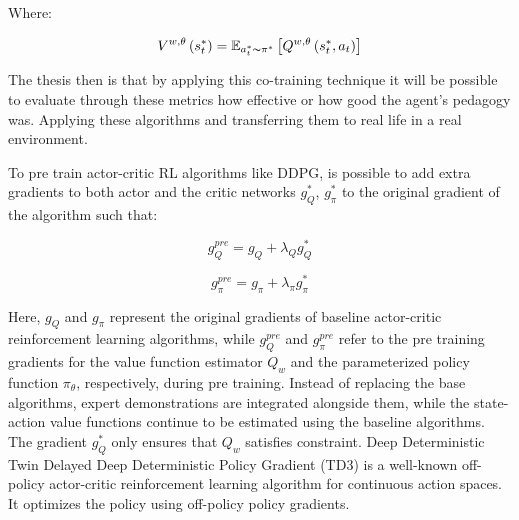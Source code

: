 Where:

\begin{equation*}
    V^{w, \theta} \left( s_{t}^{*}\right) = \mathbb{E}_{a_{t}^{*}\thicksim\pi^*}\left[Q^{w,\theta} \left( s_{t}^{*}, a_{t}\right)\right]
\end{equation*}

The thesis then is that by applying this co-training technique it will be possible to evaluate through these metrics how effective or how good the agent's pedagogy was. Applying these algorithms and transferring them to real life in a real environment.

To pre train actor-critic RL algorithms like DDPG, is possible to add extra gradients to both actor and the critic networks $g^*_Q$, $g^*_\pi$ to the original gradient of the algorithm such that:

\begin{equation}
    g^{pre}_Q = g_Q + \lambda_{Q} g^*_Q
    \label{eq: pre train gradient Q}
\end{equation}

\begin{equation}
    g^{pre}_\pi = g_\pi + \lambda_{\pi} g^*_\pi
    \label{eq: pre train gradient pi}
\end{equation}

Here, $g_Q$ and $g_\pi$ represent the original gradients of baseline actor-critic reinforcement learning algorithms, while $g_Q^{pre}$ and $g_\pi^{pre}$ refer to the pre training gradients for the value function estimator $Q_w$ and the parameterized policy function $\pi_\theta$, respectively, during pre training. Instead of replacing the base algorithms, expert demonstrations are integrated alongside them, while the state-action value functions continue to be estimated using the baseline algorithms. The gradient $g_Q^*$ only ensures that $Q_w$ satisfies constraint. Deep Deterministic Twin Delayed Deep Deterministic Policy Gradient (TD3) is a well-known off-policy actor-critic reinforcement learning algorithm for continuous action spaces. It optimizes the policy using off-policy policy gradients.

\endinput
